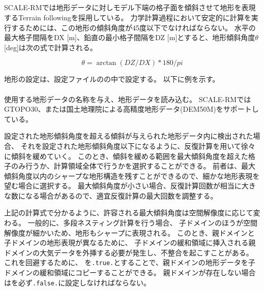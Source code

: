 \subsection{\SecBasicTopoSetting} \label{subsec:basic_usel_topo}

SCALE-RMでは地形データに対しモデル下端の格子面を傾斜させて地形を表現するTerrain followingを採用している。
力学計算過程において安定的に計算を実行するためには、この地形の傾斜角度が45度以下でなければならない。
水平の最大格子間隔をDX [m]、鉛直の最小格子間隔をDZ [m]とすると、地形傾斜角度$\theta$[deg]は次の式で計算される。

\[ \theta = \arctan( DZ/DX ) * 180/pi \]

地形の設定は、設定ファイルのの中で設定する。
以下に例を示す。\\

\\

使用する地形データの名称を与え、地形データを読み込む。
SCALE-RMではGTOPO30、または国土地理院による高精度地形データ(DEM50M)をサポートしている。

設定された地形傾斜角度を超える傾斜が与えられた地形データ内に検出された場合、
それを設定された地形傾斜角度以下になるように、反復計算を用いて徐々に傾斜を緩めていく。
このとき、傾斜を緩める範囲を最大傾斜角度を超えた格子のみ行うか、計算領域全体で行うかを選択することができる。
前者は、最大傾斜角度以内のシャープな地形構造を残すことができるので、細かな地形表現を望む場合に選択する。
最大傾斜角度が小さい場合、反復計算回数が相当に大きな数になる場合があるので、適宜反復計算の最大回数を調整する。

上記の計算式で分かるように、許容される最大傾斜角度は空間解像度に応じて変わる。
一般的に、多段ネスティング計算を行う場合、
子ドメインのほうが空間解像度が細かいため、地形もシャープに表現される。
このとき、親ドメインと子ドメインの地形表現が異なるために、
子ドメインの緩和領域に挿入される親ドメインの大気データを外挿する必要が発生し、不整合を起こすことがある。
これを回避するために、
を\verb|.true.|とすることで、親ドメインの地形データを子ドメインの緩和領域にコピーすることができる。
親ドメインが存在しない場合はを必ず\verb|.false.|に設定しなければならない。
